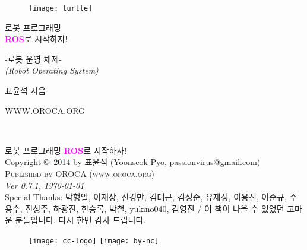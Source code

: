 \documentclass[11pt,fleqn]{book} %
\begin{document}

\begingroup
\thispagestyle{empty}
\centering
\vspace*{3cm}
\begin{figure}[h]
\centering\hspace{30pt}\texttt{[image: turtle]}
\end{figure}
\vspace*{1cm}
\par\normalfont\fontsize{50}{50}\sffamily\selectfont
로봇 프로그래밍\\
\textcolor{magenta}{\textbf{ROS}}로 시작하자!\par %
{\Huge -로봇 운영 체제-}\\ %
{\Huge \textit{(Robot Operating System)}}\par
\vspace*{6cm}
{\large 표윤석 지음}\par
{\large WWW.OROCA.ORG}\par
\endgroup


\newpage
~\vfill
\thispagestyle{empty}

\noindent 
로봇 프로그래밍 \textcolor{magenta}{\textbf{ROS}}로 시작하자!\\

\noindent Copyright \copyright\ 2014 by 표윤석 (Yoonseok Pyo, \href{mailto:passionvirus@gmail.com}{passionvirus@gmail.com})\\ %

\noindent \textsc{Published by OROCA (www.oroca.org)}\\ %

\noindent \textit{Ver 0.7.1, \today}\\ %

\noindent
Special Thanks: 박형일, 이재상, 신경만, 김대근, 김성준, 유재성, 이용진, 이준규, 주용수, 진성주, 하광진, 한승록, 박철, yukino040, 김영진 / 이 책이 나올 수 있었던 고마운 분들입니다. 다시 한번 감사 드립니다.


\begin{figure}[h]
\centering
\texttt{[image: cc-logo]}
\hspace{10pt}
\texttt{[image: by-nc]}
\end{figure}
\end{document}
